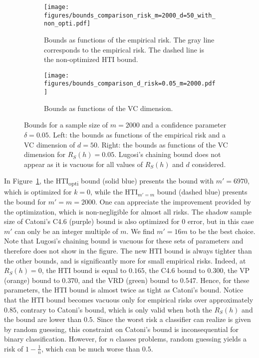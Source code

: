 \documentclass[twoside,11pt]{article}
\begin{document}
\begin{figure}[h!]
\centering
\begin{subfigure}[t]{0.485\textwidth}
    \centering
    \texttt{[image: figures/bounds\_comparison\_risk\_m=2000\_d=50\_with\_non\_opti.pdf]}
    \caption{Bounds as functions of the empirical risk. The gray line corresponds to the empirical risk. The dashed line is the non-optimized HTI bound.}
    \label{fig:bounds_comp_risk}
\end{subfigure}\hfill
\begin{subfigure}[t]{0.485\textwidth}
    \centering
    \texttt{[image: figures/bounds\_comparison\_d\_risk=0.05\_m=2000.pdf]}
    \caption{Bounds as functions of the VC dimension.}
    \label{fig:bounds_comp_d}
\end{subfigure}
\caption{
Bounds for a sample size of $m=2000$ and a confidence parameter $\delta=0.05$.
Left: the bounds as functions of the empirical risk and a VC dimension of $d=50$. Right: the bounds as functions of the VC dimension for $R_S(h) = 0.05$.
Lugosi's chaining bound does not appear as it is vacuous for all values of $R_S(h)$ and $d$ considered.
}
\label{fig:bounds_comp}
\end{figure}


In Figure~\ref{fig:bounds_comp_risk}, the HTI\textsubscript{opti} bound (solid blue) presents the bound with $m'=6970$, which is optimized for $k=0$, while the HTI$_{m'=m}$ bound (dashed blue) presents the bound for $m' = m = 2000$.
One can appreciate the improvement provided by the optimization, which is non-negligible for almost all risks.
The shadow sample size of Catoni's C4.6 (purple) bound is also optimized for 0 error, but in this case $m'$ can only be an integer multiple of $m$.
We find $m'=16m$ to be the best choice.
Note that Lugosi's chaining bound is vacuous for these sets of parameters and therefore does not show in the figure.
The new HTI bound is always tighter than the other bounds, and is significantly more for small empirical risks.
Indeed, at $R_S(h)=0$, the HTI bound is equal to $0.165$, the C4.6 bound to $0.300$, the VP (orange) bound to $0.370$, and the VRD (green) bound to $0.547$.
Hence, for these parameters, the HTI bound is almost twice as tight as Catoni's bound.
Notice that the HTI bound becomes vacuous only for empirical risks over approximately $0.85$, contrary to Catoni's bound, which is only valid when both the $R_S(h)$ and the bound are lower than $0.5$.
Since the worst risk a classifier can realize is given by random guessing, this constraint on Catoni's bound is inconsequential for binary classification.
However, for $n$ classes problems, random guessing yields a risk of $1-\frac{1}{n}$, which can be much worse than $0.5$.
\end{document}

